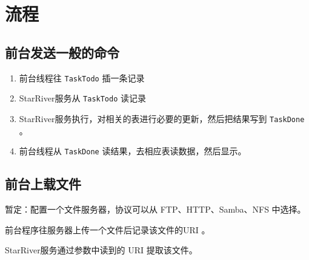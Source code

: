 \section{流程}\label{ux6d41ux7a0b}

\subsection{前台发送一般的命令}\label{ux524dux53f0ux53d1ux9001ux4e00ux822cux7684ux547dux4ee4}

\begin{enumerate}
\def\labelenumi{\arabic{enumi}.}
\itemsep1pt\parskip0pt
\item
  前台线程往 \texttt{TaskTodo} 插一条记录
\item
  StarRiver服务从 \texttt{TaskTodo} 读记录
\item
  StarRiver服务执行，对相关的表进行必要的更新，然后把结果写到
  \texttt{TaskDone} 。
\item
  前台线程从 \texttt{TaskDone} 读结果，去相应表读数据，然后显示。
\end{enumerate}

\subsection{前台上载文件}\label{ux524dux53f0ux4e0aux8f7dux6587ux4ef6}

暂定：配置一个文件服务器，协议可以从 FTP、HTTP、Samba、NFS 中选择。

前台程序往服务器上传一个文件后记录该文件的URI 。

StarRiver服务通过参数中读到的 URI 提取该文件。
